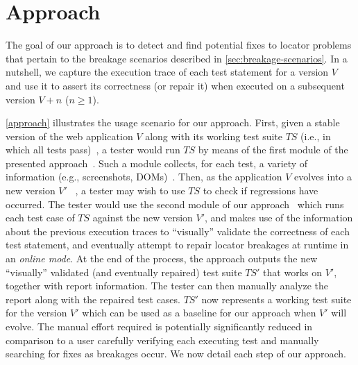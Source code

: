 \section{Approach}\label{sec:approach}

The goal of our approach is to
detect and find potential fixes to locator problems that pertain to the breakage scenarios described in \autoref{sec:breakage-scenarios}.
%
%
In a nutshell, we capture the execution trace of each test statement for a version $V$ and use it to assert its correctness (or repair it) when executed on a subsequent version $V+n$ ($n \geq 1$). 

\autoref{approach} illustrates the usage scenario for our approach. %
First, given a stable version of the web application $V$ along with its working test suite $TS$ (i.e., in which all tests pass)~, a tester would run $TS$ by means of the first module of the presented approach~. Such a module collects, for each test, a variety of information (e.g., screenshots, DOMs)~. 
Then, as the application $V$ evolves into a new version $V'$ ~, a tester may wish to use $TS$ to check if regressions have occurred. The tester would use the second module of our approach~ which runs each test case of $TS$ against the new version $V'$, and makes use of the information about the previous execution traces to ``visually'' validate the correctness of each test statement, and eventually attempt to repair locator breakages at runtime in an \textit{online mode}. At the end of the process, the approach outputs the new ``visually'' validated (and eventually repaired) test suite $TS'$ that works on $V'$, together with report information. 
The tester can then manually analyze the report along with the repaired test cases. $TS'$ now represents a working test suite for the version $V'$ which can be used as a baseline for our approach when $V'$ will evolve. 
The manual effort required is potentially significantly reduced in comparison to a user carefully verifying each executing test and manually searching for fixes as breakages occur. %
We now detail each step of our approach. 

